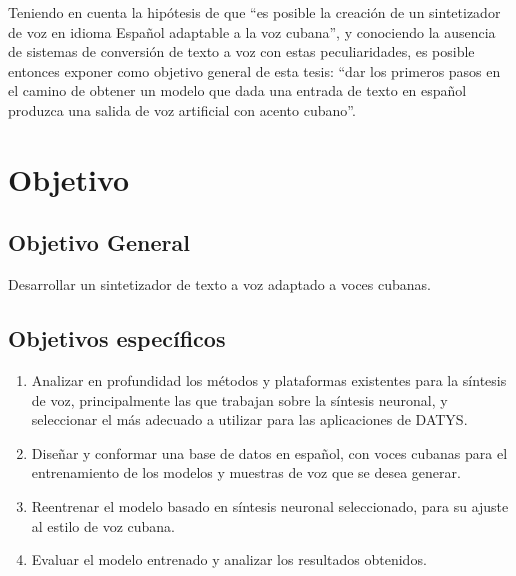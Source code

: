 Teniendo en cuenta la hipótesis de que “es posible la creación de un sintetizador de voz en idioma Español adaptable a la voz cubana”, y conociendo la ausencia de sistemas de conversión de texto a voz con estas peculiaridades, es posible entonces exponer como objetivo general de esta tesis: ``dar los primeros pasos en el camino de obtener un modelo que dada una entrada de texto en español produzca una salida de voz artificial con acento cubano''.

\section*{Objetivo}

\subsection*{Objetivo General}

Desarrollar un sintetizador de texto a voz adaptado a voces cubanas.

\subsection*{Objetivos específicos}
\begin{enumerate}
	\item Analizar en profundidad los métodos y plataformas existentes para la síntesis de voz, principalmente las que trabajan sobre la síntesis neuronal, y seleccionar el más adecuado a utilizar para las aplicaciones de DATYS.
	\item Diseñar y conformar una base de datos en español, con voces cubanas para el entrenamiento de los modelos y muestras de voz que se desea generar.
	\item Reentrenar el modelo basado en síntesis neuronal seleccionado, para su ajuste al estilo de voz cubana.
	\item Evaluar el modelo entrenado y analizar los resultados obtenidos.
\end{enumerate}